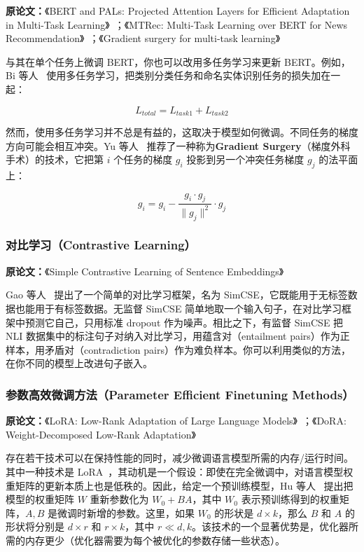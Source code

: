 \documentclass[11pt]{article}
\begin{document}
\textbf{原论文：}《BERT and PALs: Projected Attention Layers for Efficient Adaptation in Multi-Task Learning》~\cite{stickland2019bert}；《MTRec: Multi-Task Learning over BERT for News Recommendation》~\cite{bi2022mtrec}；《Gradient surgery for multi-task learning》~\cite{yu2020gradient}

与其在单个任务上微调 BERT，你也可以改用多任务学习来更新 BERT。例如，Bi 等人~\cite{bi2022mtrec} 使用多任务学习，把类别分类任务和命名实体识别任务的损失加在一起：

\begin{equation}
L_{total} = L_{task1} + L_{task2}
\end{equation}

然而，使用多任务学习并不总是有益的，这取决于模型如何微调。不同任务的梯度方向可能会相互冲突。Yu 等人~\cite{yu2020gradient} 推荐了一种称为\textbf{Gradient Surgery}（梯度外科手术）的技术，它把第 $i$ 个任务的梯度 $g_i$ 投影到另一个冲突任务梯度 $g_j$ 的法平面上：

\begin{equation}
g_i = g_i - \frac{g_i \cdot g_j}{\lVert g_j \rVert^2} \cdot g_j
\end{equation}

\subsubsection{对比学习（Contrastive Learning）}

\textbf{原论文：}《Simple Contrastive Learning of Sentence Embeddings》~\cite{gao2021simcse}

Gao 等人~\cite{gao2021simcse} 提出了一个简单的对比学习框架，名为 SimCSE，它既能用于无标签数据也能用于有标签数据。无监督 SimCSE 简单地取一个输入句子，在对比学习框架中预测它自己，只用标准 dropout 作为噪声。相比之下，有监督 SimCSE 把 NLI 数据集中的标注句子对纳入对比学习，用蕴含对（entailment pairs）作为正样本，用矛盾对（contradiction pairs）作为难负样本。你可以利用类似的方法，在你不同的模型上改进句子嵌入。

\subsubsection{参数高效微调方法（Parameter Efficient Finetuning Methods）}

\textbf{原论文：}《LoRA: Low-Rank Adaptation of Large Language Models》~\cite{hu2022lora}；《DoRA: Weight-Decomposed Low-Rank Adaptation》~\cite{liu2024dora}

存在若干技术可以在保持性能的同时，减少微调语言模型所需的内存/运行时间。其中一种技术是 LoRA~\cite{hu2022lora}，其动机是一个假设：即使在完全微调中，对语言模型权重矩阵的更新本质上也是低秩的。因此，给定一个预训练模型，Hu 等人~\cite{hu2022lora} 提出把模型的权重矩阵 $W$ 重新参数化为 $W_0 + BA$，其中 $W_0$ 表示预训练得到的权重矩阵，$A, B$ 是微调时新增的参数。这里，如果 $W_0$ 的形状是 $d \times k$，那么 $B$ 和 $A$ 的形状将分别是 $d \times r$ 和 $r \times k$，其中 $r \ll d, k$。该技术的一个显著优势是，优化器所需的内存更少（优化器需要为每个被优化的参数存储一些状态）。
\end{document}
